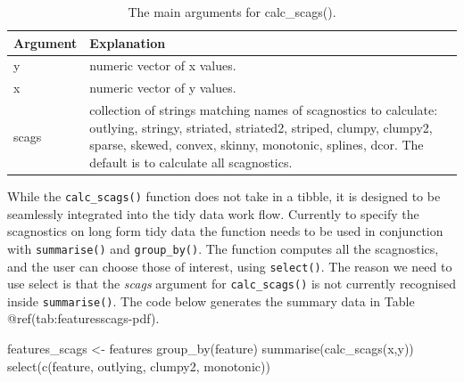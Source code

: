\begin{Schunk}
\begin{table}

\caption{\label{tab:calcfunc-tb-pdf}The main arguments for calc\_scags().}
\centering
\begin{tabular}[t]{l>{\raggedright\arraybackslash}p{12cm}}
\toprule
Argument & Explanation\\
\midrule
y & numeric vector of x values.\\
x & numeric vector of y values.\\
scags & collection of strings matching names of scagnostics to calculate: outlying, stringy, striated, striated2, striped, clumpy, clumpy2, sparse, skewed, convex, skinny, monotonic, splines, dcor. The default is to calculate all scagnostics.\\
\bottomrule
\end{tabular}
\end{table}

\end{Schunk}

While the \texttt{calc\_scags()} function does not take in a tibble, it
is designed to be seamlessly integrated into the tidy data work flow.
Currently to specify the scagnostics on long form tidy data the function
needs to be used in conjunction with \texttt{summarise()} and
\texttt{group\_by()}. The function computes all the scagnostics, and the
user can choose those of interest, using \texttt{select()}. The reason
we need to use select is that the \emph{scags} argument for
\texttt{calc\_scags()} is not currently recognised inside
\texttt{summarise()}. The code below generates the summary data in Table
@ref(tab:featuresscags-pdf).

\begin{Schunk}
\begin{Sinput}
features_scags <- features %
  group_by(feature) %
  summarise(calc_scags(x,y)) %
  select(c(feature, outlying, clumpy2, monotonic))
\end{Sinput}
\end{Schunk}

